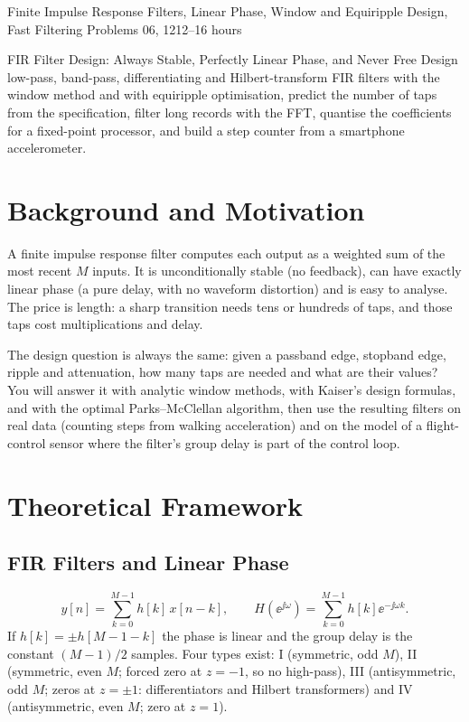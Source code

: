 \documentclass[11pt,a4paper]{article}
\begin{document}
%
{Finite Impulse Response Filters, Linear Phase, Window and Equiripple Design, Fast Filtering}%
{Problems 06, 12}{12--16 hours}

\begin{summarybox}{FIR Filter Design: Always Stable, Perfectly Linear Phase, and Never Free}
Design low-pass, band-pass, differentiating and Hilbert-transform FIR filters with the window method and with equiripple optimisation, predict the number of taps from the specification, filter long records with the FFT, quantise the coefficients for a fixed-point processor, and build a step counter from a smartphone accelerometer.
\end{summarybox}


\section*{Background and Motivation}
A finite impulse response filter computes each output as a weighted sum of the most recent $M$ inputs. It is unconditionally stable (no feedback), can have exactly linear phase (a pure delay, with no waveform distortion) and is easy to analyse. The price is length: a sharp transition needs tens or hundreds of taps, and those taps cost multiplications and delay.

The design question is always the same: given a passband edge, stopband edge, ripple and attenuation, how many taps are needed and what are their values? You will answer it with analytic window methods, with Kaiser's design formulas, and with the optimal Parks--McClellan algorithm, then use the resulting filters on real data (counting steps from walking acceleration) and on the model of a flight-control sensor where the filter's group delay is part of the control loop.

\section*{Theoretical Framework}
\subsection{FIR Filters and Linear Phase}
\begin{equation}
  y[n]=\sum_{k=0}^{M-1}h[k]\,x[n-k],\qquad H(\ee^{\jj\omega})=\sum_{k=0}^{M-1}h[k]\ee^{-\jj\omega k}.
  \label{eq:fir}
\end{equation}
If $h[k]=\pm h[M-1-k]$ the phase is linear and the group delay is the constant $(M-1)/2$ samples. Four types exist: I (symmetric, odd $M$), II (symmetric, even $M$; forced zero at $z=-1$, so no high-pass), III (antisymmetric, odd $M$; zeros at $z=\pm1$: differentiators and Hilbert transformers) and IV (antisymmetric, even $M$; zero at $z=1$).
\end{document}
